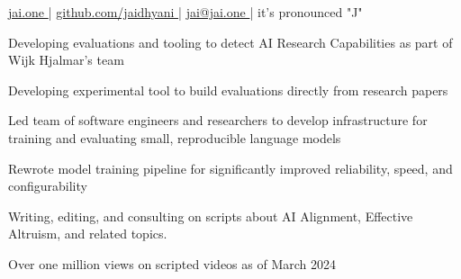 \documentclass[]{resume}
\begin{document}
%
%
\lastupdated
\github

%
%
{ 
    \href{http://jai.one }{jai.one }|
    \href{http://github.com/jaidhyani}{ github.com/jaidhyani }|
    \href{mailto:jai@jai.one}{ jai@jai.one }|
    it's pronounced "J"
}

%
%



%
%


\hfill
\begin{minipage}[t]{1.0\textwidth}






\vspace{\topsep} %

\begin{tightemize}
    \item Developing evaluations and tooling to detect AI Research Capabilities as part of Wijk Hjalmar's team
    \item Developing experimental tool to build evaluations directly from research papers
\end{tightemize}

\descript{}
\begin{tightemize}
    \item Led team of software engineers and researchers to develop infrastructure for training and evaluating small, reproducible  language models
    \item Rewrote model training pipeline for significantly improved reliability, speed, and configurability
\end{tightemize}
\begin{tightemize}
    \item Writing, editing, and consulting on scripts about AI Alignment, Effective Altruism, and related topics.
    \columnbreak
    \item Over one million views on scripted videos as of March 2024
\end{tightemize}



\end{minipage}
\end{document}
